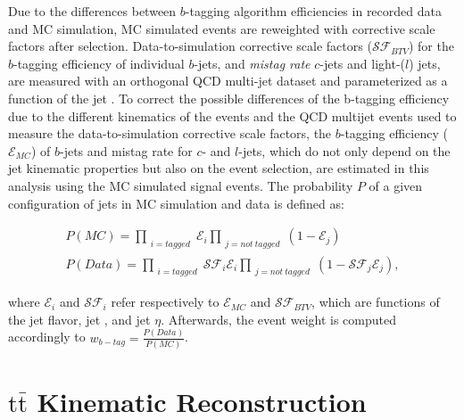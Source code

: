 Due to the differences between $b$-tagging algorithm efficiencies in recorded data and MC simulation, MC simulated events are reweighted with corrective scale factors after selection.
Data-to-simulation corrective scale factors ($\mathcal{SF}_{BTV}$) for the $b$-tagging efficiency of individual $b$-jets, and \textit{mistag rate} $c$-jets and light-($l$) jets, are measured with an orthogonal QCD multi-jet dataset and parameterized as a function of the jet \pT.
To correct the possible differences of the b-tagging efficiency due to the different kinematics of the \ttbar events and the QCD multijet events used to measure the data-to-simulation corrective scale factors, the $b$-tagging efficiency ($\mathcal{E}_{MC}$) of $b$-jets and mistag rate for $c$- and $l$-jets, which do not only depend on the jet kinematic properties but also on the event selection, are estimated in this analysis using the MC simulated \ttbar signal events.
The probability $P$ of a given configuration of jets in MC simulation and data is defined as:
\begin{linenomath*}
\begin{align}
P(MC) = \prod_{\substack{i=tagged}} \mathcal{E}_i \prod_{\substack{j=not~tagged}} (1 - \mathcal{E}_j) \\
P(Data) = \prod_{\substack{i=tagged}} \mathcal{SF}_i\mathcal{E}_i \prod_{\substack{j=not~tagged}} (1 - \mathcal{SF}_j\mathcal{E}_j),
\end{align}
\end{linenomath*}
where $\mathcal{E}_i$ and $ \mathcal{SF}_i $ refer respectively to $\mathcal{E}_{MC}$ and $\mathcal{SF}_{BTV}$, which are functions of the jet flavor, jet \pT, and jet $\eta$. 
Afterwards, the event weight is computed accordingly to $w_{b-tag} = \frac{P(Data)}{P(MC)}$.


\section{\ensuremath{\mathrm{t\bar{t}}} Kinematic Reconstruction}

